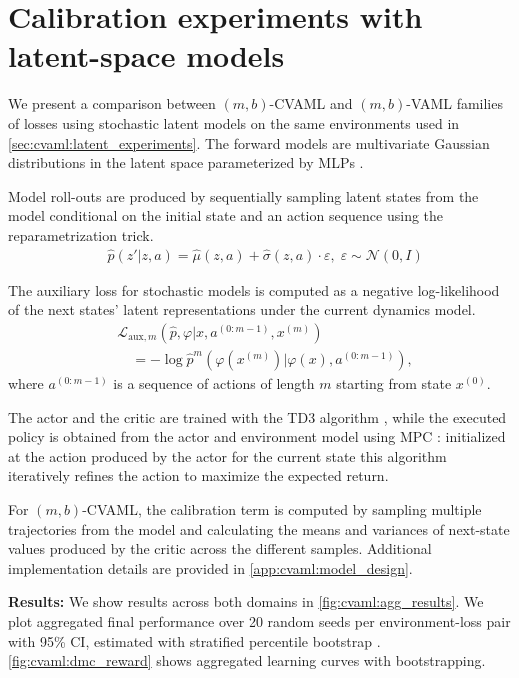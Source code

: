 \section{Calibration experiments with latent-space models}
\label{sec:cvaml:empirical2}

We present a comparison between $(m,b)$-CVAML and $(m,b)$-VAML families of losses using stochastic latent models on the same environments used in \autoref{sec:cvaml:latent_experiments}.
The forward models are multivariate Gaussian distributions in the latent space parameterized by MLPs \cite{pets,mbpo,paster2021blast}. 
 
Model roll-outs are produced by sequentially sampling latent states from the model conditional on the initial state and an action sequence using the reparametrization trick. 
\begin{align}
&\hat{p}(\hat{z}'|z,a)=\hat{\mu}(z,a) + \hat{\sigma}(z,a)\cdot\varepsilon,\; \varepsilon \sim \mathcal{N}(0,I)
\end{align}

The auxiliary loss for stochastic models is computed as a negative log-likelihood of the next states' latent representations under the current dynamics model.
\begin{align}
    &\mathcal{L}_{\mathrm{aux},m}\left(\hat{p},\varphi\Big|x,a^{(0:m-1)},x^{(m)}\right) \nonumber\\
    &\quad =-\log \hat{p}^m\left(\varphi(x^{(m)})\Big|\varphi(x),a^{(0:m-1)}\right),
\end{align}
where $a^{(0:m-1)}$ is a sequence of actions of length $m$ starting from state $x^{(0)}$.

The actor and the critic are trained with the TD3 algorithm \cite{fujimoto2018addressing}, while the executed policy is obtained from the actor and environment model using MPC \cite{hansen2022temporal}: initialized at the action produced by the actor for the current state this algorithm iteratively refines the action to maximize the expected return.

For $(m,b)$-CVAML, the calibration term is computed by sampling multiple trajectories from the model and calculating the means and variances of next-state values produced by the critic across the different samples.
Additional implementation details are provided in \autoref{app:cvaml:model_design}.

\textbf{Results:} We show results across both domains in \autoref{fig:cvaml:agg_results}.
We plot aggregated final performance over 20 random seeds per environment-loss pair with 95\% CI,  estimated with stratified percentile bootstrap \cite{agarwal2021deep}.
\autoref{fig:cvaml:dmc_reward} shows aggregated learning curves with bootstrapping.


